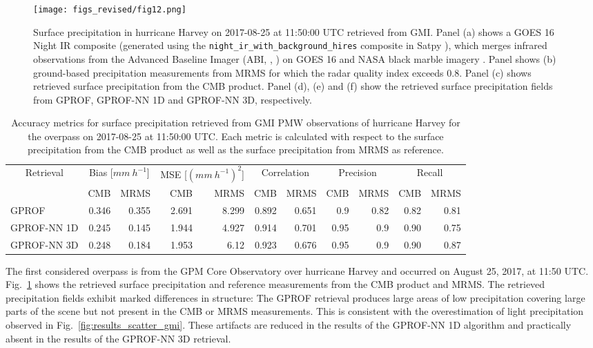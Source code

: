 \documentclass[journal abbreviation, manuscript]{copernicus}
\begin{document}
\begin{figure}[hbpt]
  \centering
  \texttt{[image: figs\_revised/fig12.png]}
  \caption{Surface precipitation in hurricane Harvey on 2017-08-25 at 11:50:00
    UTC retrieved from GMI. Panel (a) shows a GOES 16 Night IR composite
    (generated using the \texttt{night\_ir\_with\_background\_hires} composite
    in Satpy \citep{satpy}), which merges infrared observations from the
    Advanced Baseline Imager (ABI, \citeauthor{schmit05}, \citeyear{schmit05}) on
    GOES 16 and NASA black marble imagery \citep{black_marble}. Panel shows (b)
    ground-based precipitation measurements from MRMS for which the radar
    quality index exceeds 0.8. Panel (c) shows retrieved surface precipitation
    from the CMB product. Panel (d), (e) and (f) show the retrieved surface
    precipitation fields from GPROF, GPROF-NN 1D and GPROF-NN 3D, respectively.}
  \label{fig:harvey_gmi}
\end{figure}

\begin{table}[hbpt]
  \caption{Accuracy metrics for surface precipitation retrieved from GMI PMW
    observations of hurricane Harvey for the overpass on 2017-08-25 at 11:50:00
    UTC. Each metric is calculated with respect to the surface precipitation from
    the CMB product as well as  the surface precipitation
    from MRMS as reference.}
  \label{tab:hurricane_harvey_gmi}
  \begin{tabular}{|l||rr|rr|rr|rr|rr|}
    \hline
    \multicolumn{1}{|c||}{Retrieval} &
    \multicolumn{2}{c|}{Bias [$\unit{mm\ h^{-1}}$]} &
    \multicolumn{2}{c|}{MSE [$(\unit{mm\ h^{-1}})^2$]} &
    \multicolumn{2}{c|}{Correlation} &
    \multicolumn{2}{c|}{Precision} & \multicolumn{2}{c|}{Recall}\\
    & CMB & MRMS & CMB & MRMS & CMB & MRMS & CMB & MRMS & CMB & MRMS\\
    \hline
    \hline
    GPROF       & 0.346 & 0.355 & 2.691 & 8.299 & 0.892 & 0.651 & 0.9 & 0.82 & 0.82 & 0.81 \\
    GPROF-NN 1D & 0.245 & 0.145 & 1.944 & 4.927 & 0.914 & 0.701 & 0.95 & 0.9 & 0.90 & 0.75 \\
    GPROF-NN 3D & 0.248 & 0.184 & 1.953 & 6.12  & 0.923 & 0.676 & 0.95 & 0.9 & 0.90 & 0.87 \\
    \hline
    \end{tabular}
  \end{table}



The first considered overpass is from the GPM Core Observatory over hurricane
Harvey and occurred on August 25, 2017, at 11:50 UTC. Fig.~\ref{fig:harvey_gmi}
shows the retrieved surface precipitation and reference measurements from the
CMB product and MRMS. The retrieved precipitation fields exhibit marked
differences in structure: The GPROF retrieval produces large areas of low
precipitation covering large parts of the scene but not present in the CMB or
MRMS measurements. This is consistent with the overestimation of light
precipitation observed in Fig.~\ref{fig:results_scatter_gmi}. These artifacts
are reduced in the results of the GPROF-NN 1D algorithm and practically absent
in the results of the GPROF-NN 3D retrieval.
\end{document}
